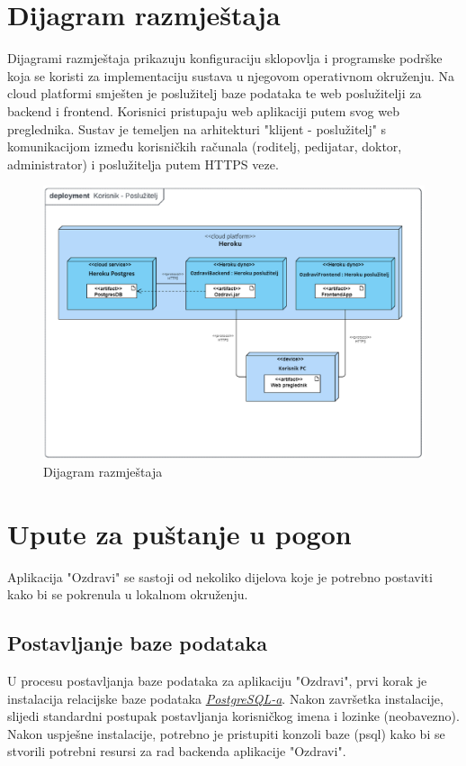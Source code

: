 			\eject
		
		\section{Dijagram razmještaja}
			Dijagrami razmještaja prikazuju konfiguraciju sklopovlja i programske podrške koja se koristi za implementaciju sustava u njegovom operativnom okruženju. Na cloud platformi smješten je poslužitelj baze podataka te web poslužitelji za backend i frontend. Korisnici pristupaju web aplikaciji putem svog web preglednika. Sustav je temeljen na arhitekturi "klijent - poslužitelj" s komunikacijom između korisničkih računala (roditelj, pedijatar, doktor, administrator) i poslužitelja putem HTTPS veze.
			\begin{figure}[H]
				\includegraphics[width=\textwidth]{slike/deploymentDiagram.png} 
				\caption{Dijagram razmještaja} 
			\end{figure}
			\eject 
		
		\section{Upute za puštanje u pogon}
			Aplikacija "Ozdravi" se sastoji od nekoliko dijelova koje je potrebno postaviti kako bi se pokrenula u lokalnom okruženju.
		
			\subsection*{Postavljanje baze podataka}
			U procesu postavljanja baze podataka za aplikaciju "Ozdravi", prvi korak je instalacija relacijske baze podataka
			\href{https://www.postgresql.org/download/}{\textit{PostgreSQL-a}}. Nakon završetka instalacije, slijedi standardni postupak postavljanja korisničkog imena i lozinke (neobavezno).
			Nakon uspješne instalacije, potrebno je pristupiti konzoli baze (psql) kako bi se stvorili potrebni resursi za rad backenda aplikacije "Ozdravi".
	
